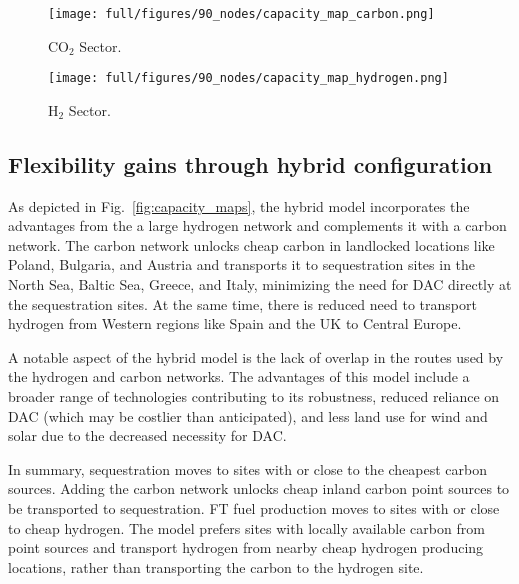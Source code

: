 \documentclass[twocolumn]{article}
\newcommand{\carbon}{CO$_2$}
\newcommand{\hydrogen}{H$_2$}
\begin{document}
\begin{figure*}[h]
    \centering
    \begin{subfigure}{.5\textwidth}
        \centering
        \texttt{[image: full/figures/90\_nodes/capacity\_map\_carbon.png]}
        \caption{\carbon{} Sector.}
        \label{fig:capacity_map_carbon_co2}
    \end{subfigure}%
    \hfill
    \begin{subfigure}{.5\textwidth}
        \centering
        \texttt{[image: full/figures/90\_nodes/capacity\_map\_hydrogen.png]}
        \caption{\hydrogen{} Sector.}
        \label{fig:capacity_map_hydrogen_co2}
    \end{subfigure}
    \caption{Optimal production and transport capacities of the carbon and hydrogen sector in a net-zero energy system in Europe with both \carbon{} and \hydrogen{} network expansion (Hybrid).
    }
    \label{fig:capacity_maps}
\end{figure*}


\subsection*{Flexibility gains through hybrid configuration}

As depicted in Fig.~\ref{fig:capacity_maps}, the hybrid model incorporates the advantages from the a large hydrogen network and complements it with a carbon network. The carbon network unlocks cheap carbon in landlocked locations like  Poland, Bulgaria, and Austria and transports it to sequestration sites in the North Sea, Baltic Sea, Greece, and Italy, minimizing the need for DAC directly at the sequestration sites. At the same time, there is reduced need to transport hydrogen from Western regions like Spain and the UK to Central Europe. 

A notable aspect of the hybrid model is the lack of overlap in the routes used by the hydrogen and carbon networks. The advantages of this model include a broader range of technologies contributing to its robustness, reduced reliance on DAC (which may be costlier than anticipated), and less land use for wind and solar due to the decreased necessity for DAC.

In summary, sequestration moves to sites with or close to the cheapest carbon sources. Adding the carbon network unlocks cheap inland carbon point sources to be transported to sequestration. FT fuel production moves to sites with or close to cheap hydrogen. The model prefers sites with locally available carbon from point sources and transport hydrogen from nearby cheap hydrogen producing locations, rather than transporting the carbon to the hydrogen site.
\end{document}
